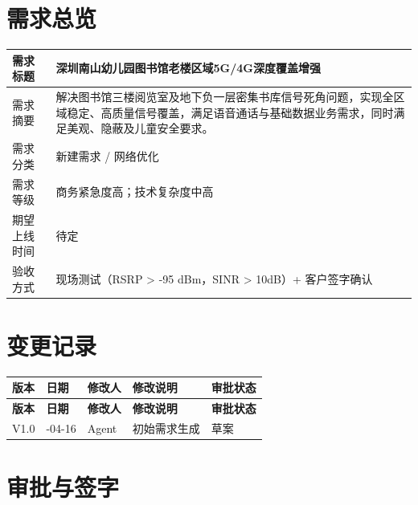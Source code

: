 \documentclass[12pt,a4paper]{ctexart}
\begin{document}
\section{需求总览}

\begin{tabularx}{\textwidth}{|P{3.2cm}|Y|}
\hline
需求标题 & 深圳南山幼儿园图书馆老楼区域5G/4G深度覆盖增强
 \\ \hline
需求摘要 & 解决图书馆三楼阅览室及地下负一层密集书库信号死角问题，实现全区域稳定、高质量信号覆盖，满足语音通话与基础数据业务需求，同时满足美观、隐蔽及儿童安全要求。
 \\ \hline
需求分类 & 新建需求 / 网络优化
 \\ \hline
需求等级 & 商务紧急度高；技术复杂度中高
 \\ \hline
期望上线时间 & 待定
 \\ \hline
验收方式 & 现场测试（RSRP > -95 dBm，SINR > 10dB）+ 客户签字确认
 \\ \hline
\end{tabularx}

\section{变更记录}

\begin{longtable}{|>{\centering\arraybackslash}p{1.4cm}|
                  >{\centering\arraybackslash}p{2.1cm}|
                  >{\centering\arraybackslash}p{1.8cm}|
                  >{\raggedright\arraybackslash}p{6.0cm}|
                  >{\centering\arraybackslash}p{1.8cm}|}
\hline
\textbf{版本} & \textbf{日期} & \textbf{修改人} & \textbf{修改说明} & \textbf{审批状态} \\
\hline
\endfirsthead

\hline
\textbf{版本} & \textbf{日期} & \textbf{修改人} & \textbf{修改说明} & \textbf{审批状态} \\
\hline
\endhead

\hline
\endfoot

\hline
\endlastfoot

V1.0 & 2026-04-16 & Agent & 初始需求生成 & 草案 \\ \hline
\end{longtable}

\section{审批与签字}
\end{document}
